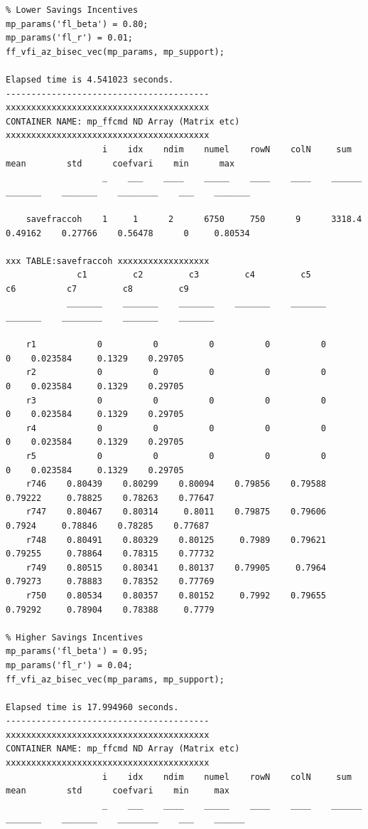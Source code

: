 \documentclass[
]{book}
\begin{document}
\begin{verbatim}
% Lower Savings Incentives
mp_params('fl_beta') = 0.80;
mp_params('fl_r') = 0.01;
ff_vfi_az_bisec_vec(mp_params, mp_support);

Elapsed time is 4.541023 seconds.
----------------------------------------
xxxxxxxxxxxxxxxxxxxxxxxxxxxxxxxxxxxxxxxx
CONTAINER NAME: mp_ffcmd ND Array (Matrix etc)
xxxxxxxxxxxxxxxxxxxxxxxxxxxxxxxxxxxxxxxx
                   i    idx    ndim    numel    rowN    colN     sum       mean        std      coefvari    min      max  
                   _    ___    ____    _____    ____    ____    ______    _______    _______    ________    ___    _______

    savefraccoh    1     1      2      6750     750      9      3318.4    0.49162    0.27766    0.56478      0     0.80534

xxx TABLE:savefraccoh xxxxxxxxxxxxxxxxxx
              c1         c2         c3         c4         c5         c6          c7         c8         c9   
            _______    _______    _______    _______    _______    _______    ________    _______    _______

    r1            0          0          0          0          0          0    0.023584     0.1329    0.29705
    r2            0          0          0          0          0          0    0.023584     0.1329    0.29705
    r3            0          0          0          0          0          0    0.023584     0.1329    0.29705
    r4            0          0          0          0          0          0    0.023584     0.1329    0.29705
    r5            0          0          0          0          0          0    0.023584     0.1329    0.29705
    r746    0.80439    0.80299    0.80094    0.79856    0.79588    0.79222     0.78825    0.78263    0.77647
    r747    0.80467    0.80314     0.8011    0.79875    0.79606     0.7924     0.78846    0.78285    0.77687
    r748    0.80491    0.80329    0.80125     0.7989    0.79621    0.79255     0.78864    0.78315    0.77732
    r749    0.80515    0.80341    0.80137    0.79905     0.7964    0.79273     0.78883    0.78352    0.77769
    r750    0.80534    0.80357    0.80152     0.7992    0.79655    0.79292     0.78904    0.78388     0.7779

% Higher Savings Incentives
mp_params('fl_beta') = 0.95;
mp_params('fl_r') = 0.04;
ff_vfi_az_bisec_vec(mp_params, mp_support);

Elapsed time is 17.994960 seconds.
----------------------------------------
xxxxxxxxxxxxxxxxxxxxxxxxxxxxxxxxxxxxxxxx
CONTAINER NAME: mp_ffcmd ND Array (Matrix etc)
xxxxxxxxxxxxxxxxxxxxxxxxxxxxxxxxxxxxxxxx
                   i    idx    ndim    numel    rowN    colN     sum       mean        std      coefvari    min     max  
                   _    ___    ____    _____    ____    ____    ______    _______    _______    ________    ___    ______


\end{verbatim}
\end{document}
